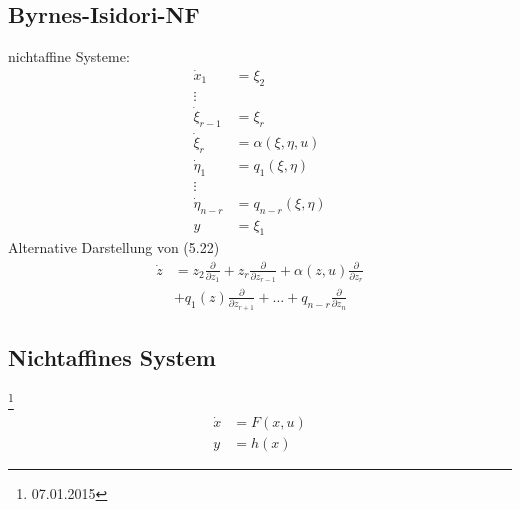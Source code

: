 \documentclass[ngerman]{tudscrreprt}
\begin{document}
\subsection*{Byrnes-Isidori-NF}
nichtaffine Systeme: \begin{align*}
\dot x_1 &= \xi_2\\ 
\vdots\\ 
\dot \xi_{r-1}&= \xi_r\\ \tag{5.22}
\dot \xi_r &= \alpha(\xi, \eta, u)\\ 
\dot \eta_1 &= q_1(\xi,\eta)\\ 
\vdots\\ 
\dot \eta_{n-r} &= q_{n-r}(\xi, \eta)\\ 
y &= \xi_1
\end{align*}
Alternative Darstellung von (5.22)\begin{align*}
\dot z &= z_2\frac{\partial}{\partial z_1} + z_r \frac{\partial }{\partial z_{r-1}} + \alpha(z,u)\frac{\partial}{\partial z_r}\\ 
&+q_1(z)\frac{\partial}{\partial z_{r+1}} + \dots + q_{n-r}\frac{\partial}{\partial z_n} \tag{5.23}
\end{align*}
\subsection*{Nichtaffines System}
\footnote{07.01.2015} 
\begin{align*}
\dot x &= F(x,u)\\ 
y &= h(x) \tag{5.20}
\end{align*}
\end{document}
